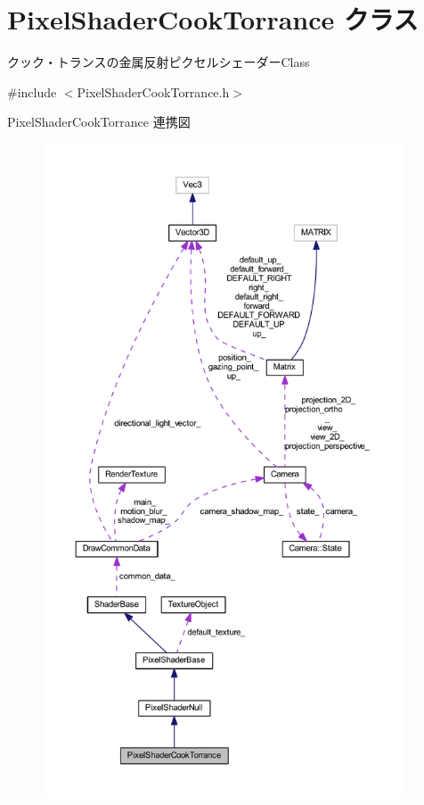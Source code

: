 \hypertarget{class_pixel_shader_cook_torrance}{}\section{Pixel\+Shader\+Cook\+Torrance クラス}
\label{class_pixel_shader_cook_torrance}


クック・トランスの金属反射ピクセルシェーダー\+Class  




{\ttfamily \#include $<$Pixel\+Shader\+Cook\+Torrance.\+h$>$}



Pixel\+Shader\+Cook\+Torrance 連携図\nopagebreak
\begin{figure}[H]
\begin{center}
\leavevmode
\includegraphics[height=550pt]{class_pixel_shader_cook_torrance__coll__graph}
\end{center}
\end{figure}
